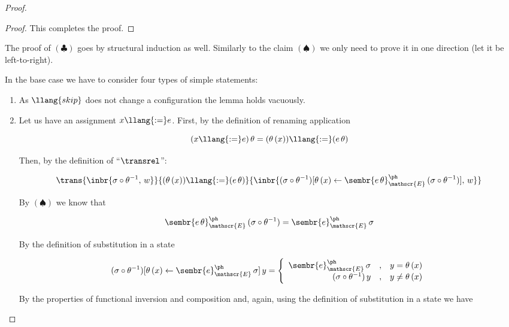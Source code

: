 \begin{proof}
\begin{proof}
    This completes the proof.
  \end{proof}

  The proof of $(\clubsuit)$ goes by structural induction as well. Similarly to the claim $(\spadesuit)$ we only need to prove it in
  one direction (let it be left-to-right).

  In the base case we have to consider four types of simple statements:

  \begin{enumerate}
  \item As $\llang{skip}$ does not change a configuration the lemma holds vacuously.
  \item Let us have an assignment $x\llang{:=}e$. First, by the definition of renaming application

    \[
    (x\llang{:=}e)\,\theta=(\theta\,(x))\llang{:=}(e\,\theta)
    \]

    Then, by the definition of ``$\transrel$'':

    \[
    \trans{\inbr{\sigma\circ\theta^{-1},\,w}}{(\theta\,(x))\llang{:=}(e\,\theta)}{\inbr{(\sigma\circ\theta^{-1})[\theta\,(x)\gets\sembr{e\,\theta}^\ph_\mathscr{E}\,(\sigma\circ\theta^{-1})],\,w}}
    \]

    By $(\spadesuit)$ we know that

    \[
    \sembr{e\,\theta}^\ph_\mathscr{E}\,(\sigma\circ\theta^{-1})=\sembr{e}^\ph_\mathscr{E}\,\sigma
    \]

    By the definition of substitution in a state

    \[
    (\sigma\circ\theta^{-1})[\theta\,(x)\gets\sembr{e}^\ph_\mathscr{E}\,\sigma]\,y=\left\{\begin{array}{rcl}
                                                                                         \sembr{e}^\ph_\mathscr{E}\,\sigma&,&y=\theta\,(x)\\
                                                                                         (\sigma\circ\theta^{-1})\,y&,&y\ne\theta\,(x)
                                                                                       \end{array}\right.
    \]

    By the properties of functional inversion and composition and, again, using the definition of substitution in a state we have


\end{enumerate}
\end{proof}
